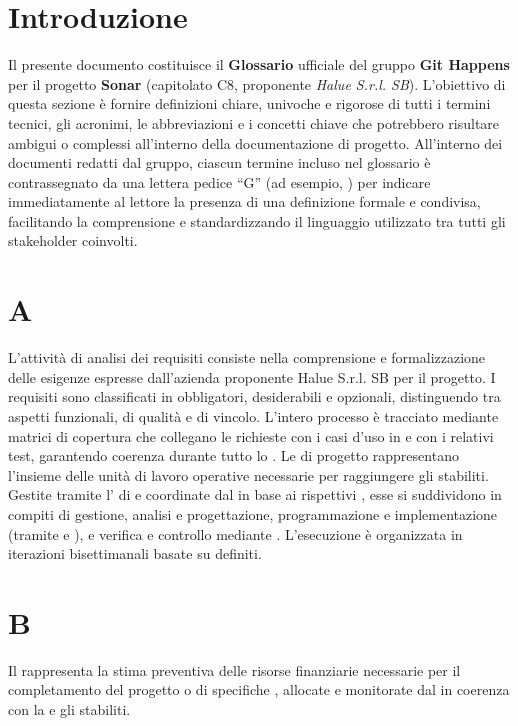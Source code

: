 \appendix
\setcounter{tocdepth}{1}
\setcounter{secnumdepth}{0}

\section{Introduzione}
Il presente documento costituisce il \textbf{Glossario} ufficiale del gruppo \textbf{Git Happens} per il progetto \textbf{Sonar} (capitolato C8, proponente \textit{Halue S.r.l. SB}). 
L'obiettivo di questa sezione è fornire definizioni chiare, univoche e rigorose di tutti i termini tecnici, gli acronimi, le abbreviazioni e i concetti chiave che potrebbero risultare ambigui o complessi all'interno della documentazione di progetto. 
All'interno dei documenti redatti dal gruppo, ciascun termine incluso nel glossario è contrassegnato da una lettera pedice ``G'' (ad esempio, ) per indicare immediatamente al lettore la presenza di una definizione formale e condivisa, facilitando la comprensione e standardizzando il linguaggio utilizzato tra tutti gli stakeholder coinvolti.
\section{A}
L'attività di analisi dei requisiti consiste nella comprensione e formalizzazione delle esigenze espresse dall'azienda proponente Halue S.r.l. SB per il progetto. I requisiti sono classificati in obbligatori, desiderabili e opzionali, distinguendo tra aspetti funzionali, di qualità e di vincolo. L'intero processo è tracciato mediante matrici di copertura che collegano le richieste con i casi d'uso in  e con i relativi test, garantendo coerenza durante tutto lo .
Le  di progetto rappresentano l'insieme delle unità di lavoro operative necessarie per raggiungere gli  stabiliti. Gestite tramite l' di  e coordinate dal  in base ai rispettivi , esse si suddividono in compiti di gestione, analisi e progettazione, programmazione e implementazione (tramite  e ), e verifica e controllo mediante . L'esecuzione è organizzata in iterazioni bisettimanali basate su  definiti.
\section{B}
Il  rappresenta la stima preventiva delle risorse finanziarie necessarie per il completamento del progetto o di specifiche , allocate e monitorate dal  in coerenza con la  e gli  stabiliti.

